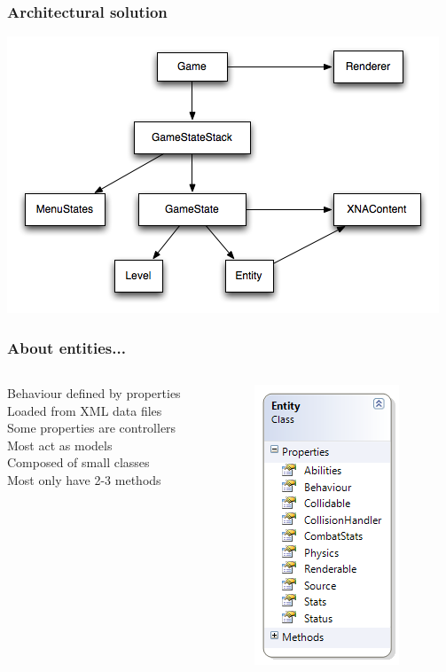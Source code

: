 \documentclass[screen]{beamer}
\begin{document}
\begin{frame}
  \frametitle{Architectural solution}
  \includegraphics[scale=0.5]{classes}
\end{frame}

\begin{frame}
  \frametitle{About entities...}
  \begin{columns}
    \begin{column}{0.6\linewidth}
      Behaviour defined by properties\\
      Loaded from XML data files\\
      Some properties are controllers\\
      Most act as models\\
      Composed of small classes\\
      Most only have 2-3 methods\\
    \end{column}
    \begin{column}{0.4\linewidth}
      \includegraphics[scale=0.7]{../reports/graphics/entity}
    \end{column}
  \end{columns}
\end{frame}
\end{document}
